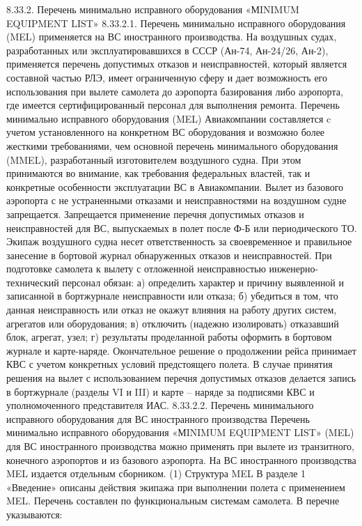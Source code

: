 8.33.2. Перечень минимально исправного оборудования «МINIMUM EQUIPMENT LIST»
8.33.2.1. Перечень минимально исправного оборудования (MEL) применяется на ВС иностранного производства. На воздушных судах, разработанных или эксплуатировавшихся в СССР (Ан-74, Ан-24/26, Ан-2), применяется перечень допустимых отказов и неисправностей, который является составной частью РЛЭ, имеет ограниченную сферу и дает возможность его использования при вылете самолета до аэропорта базирования либо аэропорта, где имеется сертифицированный персонал для выполнения ремонта. 
Перечень минимально исправного оборудования (MEL) Авиакомпании составляется c учетом установленного на конкретном ВС оборудования и возможно более жесткими требованиями, чем основной перечень минимального оборудования (MMEL), разработанный изготовителем воздушного судна.
При этом принимаются во внимание, как требования федеральных властей, так и конкретные особенности эксплуатации ВС в Авиакомпании.
Вылет из базового аэропорта с не устраненными отказами и неисправностями на воздушном судне запрещается.
Запрещается применение перечня допустимых отказов и неисправностей для ВС, выпускаемых в полет после Ф-Б или периодического ТО.
Экипаж воздушного судна несет ответственность за своевременное и правильное занесение в бортовой журнал обнаруженных отказов и неисправностей. 
При подготовке самолета к вылету с отложенной неисправностью инженерно-технический персонал обязан:
а)	определить характер и причину выявленной и записанной в бортжурнале неисправности или отказа;
б)	убедиться в том, что данная неисправность или отказ не окажут влияния на работу других систем, агрегатов или оборудования;
в)	отключить (надежно изолировать) отказавший блок, агрегат, узел;
г)	результаты проделанной работы оформить в бортовом журнале и карте-наряде.
Окончательное решение о продолжении рейса принимает КВС с учетом конкретных условий предстоящего полета.
В случае принятия решения на вылет с использованием перечня допустимых отказов делается запись в бортжурнале (разделы VI и III) и карте – наряде за подписями КВС и уполномоченного представителя ИАС.
8.33.2.2.	Перечень минимального исправного оборудования для ВС иностранного производства
Перечень минимально исправного оборудования «МINIMUM EQUIPMENT LIST» (MEL) для ВС иностранного производства можно применять при вылете из транзитного, конечного аэропортов и из базового аэропорта.
На ВС иностранного производства MEL издается отдельным сборником.
(1) Структура MEL
В разделе 1 «Введение» описаны действия экипажа при выполнении полета с применением MEL.
Перечень составлен по функциональным системам самолета. В перечне указываются:
